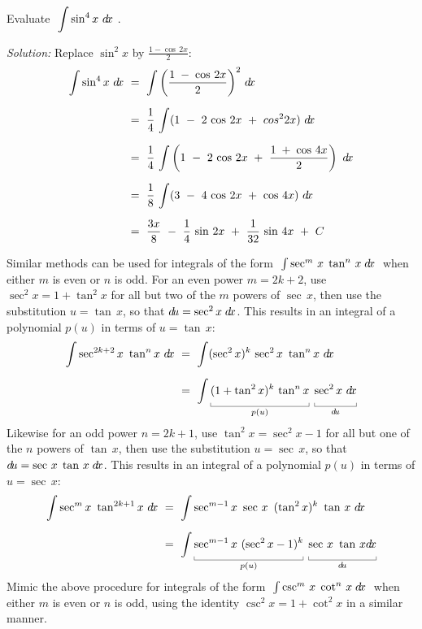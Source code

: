 \begin{exmp}\label{exmp:trigint4}
\noindent Evaluate $~\displaystyle\int \sin^4 x ~d\!x~$.\vspace{1mm}
\par\noindent\emph{Solution:} Replace $\sin^2 x$ by $\frac{1 - \cos\,2x}{2}$:
\begin{align*}
\int \sin^4 x~d\!x ~&=~ \int \left(\frac{1 \;-\; \cos\,2x}{2}\right)^2 \,d\!x\\[6pt]
&=~ \frac{1}{4}\,\int (1 ~-~ 2\,\cos\,2x ~+~ cos^2 2x)~d\!x\\[6pt]
&=~ \frac{1}{4}\,\int \left(1 ~-~ 2\,\cos\,2x ~+~ \frac{1 \;+\; \cos\,4x}{2}\right)~d\!x\\[6pt]
&=~ \frac{1}{8}\,\int (3 ~-~ 4\,\cos\,2x ~+~ \cos\,4x)~d\!x\\[6pt]
&=~ \frac{3x}{8} ~-~ \frac{1}{4}\,\sin\,2x ~+~ \frac{1}{32}\,\sin\,4x ~+~ C
\end{align*}
\end{exmp}
\divider
\newpage
Similar methods can be used for integrals of the form
$\;\int \sec^m\,x\;\tan^n\,x\;d\!x\;$ when either $m$ is even or $n$ is odd. For
an even power $m = 2k+2$, use $\sec^2 x = 1 + \tan^2 x$ for all but two of the
$m$ powers of $\sec\,x$, then use the substitution $u=\tan\,x$, so that
$d\!u=\sec^2 x\;d\!x$. This results in an integral of a polynomial $p(u)$ in terms
of $u=\tan\,x$:
\begin{align*}
\int \sec^{2k+2} x ~\tan^n x~\dx ~&=~ \int (\sec^2 x)^k \,\sec^2 x~\tan^n x~\dx\\[6pt]
&=~ \int \underbracket[0.3pt]{(1 + \tan^2 x)^k\,\tan^n x\vphantom{\frac{1}{2}}}_{p(u)}
\;\underbracket[0.3pt]{\sec^2 x~\dx\vphantom{\frac{1}{2}}}_{\du}
\end{align*}
Likewise for an odd power $n=2k+1$, use $\tan^2 x = \sec^2 x - 1$ for all but
one of the $n$ powers of $\tan\,x$, then use the substitution $u=\sec\,x$, so
that $d\!u=\sec\,x\;\tan\,x\;d\!x$. This results in an integral of a polynomial
$p(u)$ in terms of $u=\sec\,x$:
\begin{align*}
\int \sec^m x ~\tan^{2k+1} x~\dx ~&=~ \int \sec^{m-1} x~\sec\,x \,~(\tan^2 x)^k ~\tan\,x~\dx\\[6pt]
&=~ \int \underbracket[0.3pt]{\sec^{m-1} x~(\sec^2 x - 1)^k\vphantom{\frac{1}{2}}}_{p(u)}
\;\underbracket[0.3pt]{\sec\,x~\tan\,x\dx\vphantom{\frac{1}{2}}}_{\du}
\end{align*}
Mimic the above procedure for integrals of the form
$\;\int \csc^m\,x\;\cot^n\,x\;d\!x\;$ when either $m$ is even or $n$ is odd,
using the identity $\csc^2 x = 1 + \cot^2 x$ in a similar manner.

